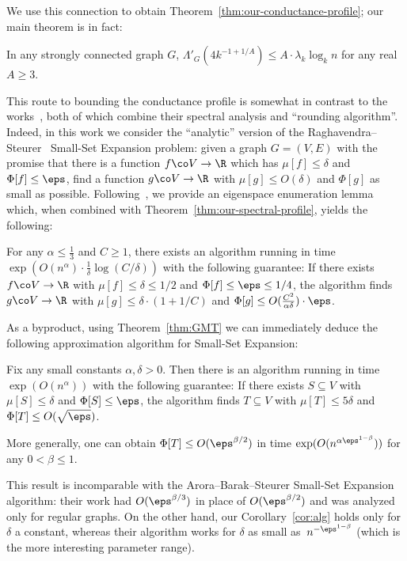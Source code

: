 \documentclass[11pt]{article}
\newcommand{\Bdry}{\Phi}
\newcommand{\Spars}{\mu}
\begin{document}
We use this connection to obtain Theorem~\ref{thm:our-conductance-profile}; our main theorem is in fact:
\begin{theorem} \label{thm:our-spectral-profile}
    In any strongly connected graph $G$, $\Lambda'_G(4 k^{-1+1/A}) \leq A \cdot \lambda_k \log_k n$ for any real $A \geq 3$.
\end{theorem}
This route to bounding the conductance profile is somewhat in contrast to the works~\cite{LRTV12,LOT12}, both of which combine their spectral analysis and ``rounding algorithm''.\\

Indeed, in this work we consider the ``analytic'' version of the Raghavendra--Steurer~\cite{RS10} Small-Set Expansion problem: given a graph $G = (V,E)$ with the promise that there is a function $f \co V \to \R$ which has $\mu[f] \leq \delta$ and $\Bdry[f] \leq \eps$, find a function $g \co V \to \R$ with $\mu[g] \leq O(\delta)$ and $\Bdry[g]$ as small as possible.  Following~\cite{ABS10}, we provide an eigenspace enumeration lemma which, when combined with Theorem~\ref{thm:our-spectral-profile}, yields the following:
\begin{theorem} \label{thm:our-alg}
    For any $\alpha \leq \frac13$ and $C \geq 1$, there exists an algorithm running in time $\exp(O(n^\alpha) \cdot\tfrac{1}{\delta}\log(C/\delta))$ with the following guarantee:  If there exists $f \co V \to \R$ with $\Spars[f] \leq \delta \leq 1/2$ and $\Bdry[f] \leq \eps \leq 1/4$, the algorithm finds $g \co V \to \R$ with $\Spars[g] \leq \delta \cdot(1+1/C)$ and $\Bdry[g] \leq O(\frac{C^2}{\alpha \delta}) \cdot \eps$.
\end{theorem}

As a byproduct, using Theorem~\ref{thm:GMT} we can immediately deduce the following approximation algorithm for Small-Set Expansion:
\begin{corollary} \label{cor:alg}
    Fix any small constants $\alpha, \delta > 0$.  Then there is an algorithm running in time $\exp(O(n^\alpha))$ with the following guarantee:  If there exists $S \subseteq V$ with $\Spars[S] \leq \delta$ and $\Bdry[S] \leq \eps$, the algorithm finds $T \subseteq V$ with $\Spars[T] \leq 5\delta$ and $\Bdry[T] \leq O(\sqrt{\eps})$.

    More generally, one can obtain $\Bdry[T] \leq O(\eps^{\beta/2})$ in time $\exp(O(n^{\alpha \eps^{1-\beta}}))$ for any $0 < \beta \leq 1$.
\end{corollary}

This result is incomparable with the Arora--Barak--Steurer Small-Set Expansion algorithm: their work had $O(\eps^{\beta/3})$ in place of $O(\eps^{\beta/2})$ and was analyzed only for regular graphs. On the other hand, our Corollary~\ref{cor:alg} holds only for $\delta$ a constant, whereas their algorithm works for $\delta$ as small as~$n^{-\eps^{1-\beta}}$ (which is the more interesting parameter range).
\end{document}
